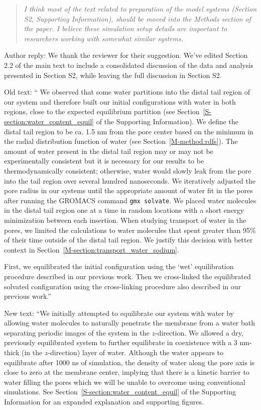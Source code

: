 \documentclass{article}
\begin{document}
\begin{enumerate}
\begin{quote}
    \textit{I think most of the text related to preparation of the model systems (Section S2, 
    Supporting Information), should be moved into the Methods section of the paper. I believe 
    these simulation setup details are important to researchers working with somewhat similar 
    systems.}
    
    \end{quote}
    
    Author reply: We thank the reviewer for their suggestion. We've edited Section 2.2 of the main
    text to include a consolidated discussion of the data and analysis presented in Section S2, 
    while leaving the full discussion in Section S2.
    
    Old text: `` We observed that some water partitions into the distal tail region of our system and therefore
	built our initial configurations with water in both regions, close to the expected
	equilibrium partition (see Section~\ref{S-section:water_content_equil} of the Supporting
	Information). We define the distal tail region to be ca. 1.5 nm from the pore
	center based on the minimum in the radial distribution function of water
	(see Section~\ref{M-method:rdfs}). The amount of water present in the distal tail region
	may or may not be experimentally consistent but it is necessary for our results to be 
	thermodynamically consistent; otherwise, water would slowly leak from the pore into the
	tail region over several hundred nanoseconds. We iteratively adjusted the pore radius in our systems
	until the appropriate amount of water fit in the pores after running the GROMACS command
	\texttt{gmx solvate}. We placed water molecules in the distal tail region one at a time
	in random locations with a short energy minimization between each insertion. When 
	studying transport of water in the pores, we limited the calculations to water molecules
	that spent greater than 95\% of their time outside of the distal tail region. We 
	justify this decision with better context in Section~\ref{M-section:transport_water_sodium}.
	
    First, we equilibrated the initial configuration using the `wet' equilibration procedure 
	described in our previous work. Then we cross-linked the equilibrated solvated 
	configuration using the cross-linking procedure also described in our previous 
    work.''
           
    New text: ``We initially attempted to equilibrate our system with water by allowing water
	molecules to naturally penetrate the membrane from a water bath separating
	periodic images of the system in the $z$-direction. We allowed a dry, previously
	equilibrated system to further equilibrate in coexistence with a 3 nm-thick 
	(in the $z$-direction) layer of water. Although the water appears to equilibrate
	after 1000 ns of simulation, the density of water along the pore axis
	is close to zero at the membrane center, implying that there is a kinetic
	barrier to water filling the pores which we will be unable to overcome using
	conventional simulations. See Section~\ref{S-section:water_content_equil} 
    of the Supporting Information for an expanded explanation and supporting figures. 
	 

\end{enumerate}
\end{document}
